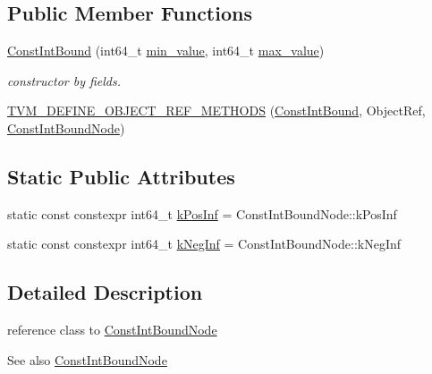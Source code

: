 \subsection*{Public Member Functions}
\begin{DoxyCompactItemize}
\item 
\hyperlink{classtvm_1_1arith_1_1ConstIntBound_aefb417203cf5c5996d7ed664051aaba3}{Const\+Int\+Bound} (int64\+\_\+t \hyperlink{namespacetvm_a9c126a8dde0d4079713969ca574f172e}{min\+\_\+value}, int64\+\_\+t \hyperlink{namespacetvm_a2741c5a48b50bf369026a1bbdf02017f}{max\+\_\+value})
\begin{DoxyCompactList}\small\item\em constructor by fields. \end{DoxyCompactList}\item 
\hyperlink{classtvm_1_1arith_1_1ConstIntBound_a2a26440158e4037dc8f82ba6ad0f296b}{T\+V\+M\+\_\+\+D\+E\+F\+I\+N\+E\+\_\+\+O\+B\+J\+E\+C\+T\+\_\+\+R\+E\+F\+\_\+\+M\+E\+T\+H\+O\+DS} (\hyperlink{classtvm_1_1arith_1_1ConstIntBound}{Const\+Int\+Bound}, Object\+Ref, \hyperlink{classtvm_1_1arith_1_1ConstIntBoundNode}{Const\+Int\+Bound\+Node})
\end{DoxyCompactItemize}
\subsection*{Static Public Attributes}
\begin{DoxyCompactItemize}
\item 
static const constexpr int64\+\_\+t \hyperlink{classtvm_1_1arith_1_1ConstIntBound_af55f0ada0b9e784197723b125f464f0f}{k\+Pos\+Inf} = Const\+Int\+Bound\+Node\+::k\+Pos\+Inf
\item 
static const constexpr int64\+\_\+t \hyperlink{classtvm_1_1arith_1_1ConstIntBound_a6ac84681107f25f66b84209a346383d9}{k\+Neg\+Inf} = Const\+Int\+Bound\+Node\+::k\+Neg\+Inf
\end{DoxyCompactItemize}


\subsection{Detailed Description}
reference class to \hyperlink{classtvm_1_1arith_1_1ConstIntBoundNode}{Const\+Int\+Bound\+Node} 

\begin{DoxySeeAlso}{See also}
\hyperlink{classtvm_1_1arith_1_1ConstIntBoundNode}{Const\+Int\+Bound\+Node} 
\end{DoxySeeAlso}


